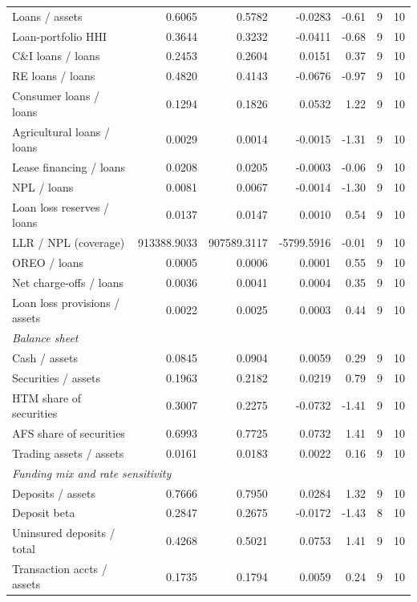 \begin{tabular}{lrrrrrr}
\midrule
Loans / assets & 0.6065 & 0.5782 & -0.0283 & -0.61 & 9 & 10 \\
Loan-portfolio HHI & 0.3644 & 0.3232 & -0.0411 & -0.68 & 9 & 10 \\
C\&I loans / loans & 0.2453 & 0.2604 & 0.0151 & 0.37 & 9 & 10 \\
RE loans / loans & 0.4820 & 0.4143 & -0.0676 & -0.97 & 9 & 10 \\
Consumer loans / loans & 0.1294 & 0.1826 & 0.0532 & 1.22 & 9 & 10 \\
Agricultural loans / loans & 0.0029 & 0.0014 & -0.0015 & -1.31 & 9 & 10 \\
Lease financing / loans & 0.0208 & 0.0205 & -0.0003 & -0.06 & 9 & 10 \\
NPL / loans & 0.0081 & 0.0067 & -0.0014 & -1.30 & 9 & 10 \\
Loan loss reserves / loans & 0.0137 & 0.0147 & 0.0010 & 0.54 & 9 & 10 \\
LLR / NPL (coverage) & 913388.9033 & 907589.3117 & -5799.5916 & -0.01 & 9 & 10 \\
OREO / loans & 0.0005 & 0.0006 & 0.0001 & 0.55 & 9 & 10 \\
Net charge-offs / loans & 0.0036 & 0.0041 & 0.0004 & 0.35 & 9 & 10 \\
Loan loss provisions / assets & 0.0022 & 0.0025 & 0.0003 & 0.44 & 9 & 10 \\
\midrule
\multicolumn{7}{l}{\emph{Balance sheet}} \\
\midrule
Cash / assets & 0.0845 & 0.0904 & 0.0059 & 0.29 & 9 & 10 \\
Securities / assets & 0.1963 & 0.2182 & 0.0219 & 0.79 & 9 & 10 \\
HTM share of securities & 0.3007 & 0.2275 & -0.0732 & -1.41 & 9 & 10 \\
AFS share of securities & 0.6993 & 0.7725 & 0.0732 & 1.41 & 9 & 10 \\
Trading assets / assets & 0.0161 & 0.0183 & 0.0022 & 0.16 & 9 & 10 \\
\midrule
\multicolumn{7}{l}{\emph{Funding mix and rate sensitivity}} \\
\midrule
Deposits / assets & 0.7666 & 0.7950 & 0.0284 & 1.32 & 9 & 10 \\
Deposit beta & 0.2847 & 0.2675 & -0.0172 & -1.43 & 8 & 10 \\
Uninsured deposits / total & 0.4268 & 0.5021 & 0.0753 & 1.41 & 9 & 10 \\
Transaction accts / assets & 0.1735 & 0.1794 & 0.0059 & 0.24 & 9 & 10 \\

\end{tabular}
